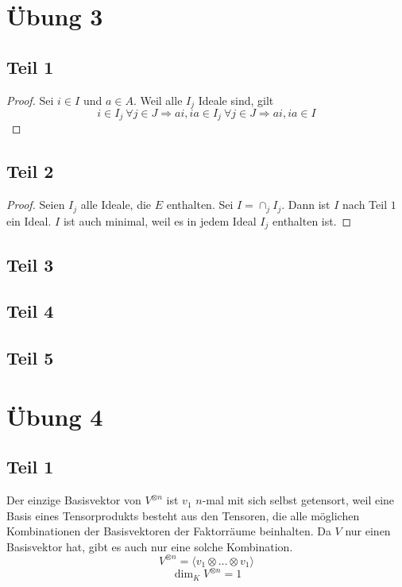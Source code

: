 \documentclass[10pt,a4paper]{article}
\begin{document}
\section*{Übung 3}

\subsection*{Teil 1}

\begin{proof}
Sei $i \in I$ und $a \in A$.
Weil alle $I_{j}$ Ideale sind, gilt
\begin{equation}
i \in I_{j}\ \forall j \in J \Rightarrow ai, ia \in I_{j}\ \forall j \in J \Rightarrow ai, ia \in I
\end{equation}
\end{proof}

\subsection*{Teil 2}

\begin{proof}
Seien $I_{j}$ alle Ideale, die $E$ enthalten.
Sei $I = \cap_{j} I_{j}$.
Dann ist $I$ nach Teil $1$ ein Ideal.
$I$ ist auch minimal, weil es in jedem Ideal $I_{j}$ enthalten ist.
\end{proof}

\subsection*{Teil 3}

\subsection*{Teil 4}

\subsection*{Teil 5}

\section*{Übung 4}

\subsection*{Teil 1}

Der einzige Basisvektor von $V^{\otimes n}$ ist $v_{1}$ $n$-mal mit sich selbst getensort,
weil eine Basis eines Tensorprodukts besteht aus den Tensoren, die alle möglichen Kombinationen der Basisvektoren der Faktorräume beinhalten.
Da $V$ nur einen Basisvektor hat, gibt es auch nur eine solche Kombination.
\begin{equation}
V^{\otimes n} = \langle v_{1} \otimes \dots \otimes v_{1} \rangle
\end{equation}
\begin{equation}
\dim_{K} V^{\otimes n} = 1
\end{equation}
\end{document}

